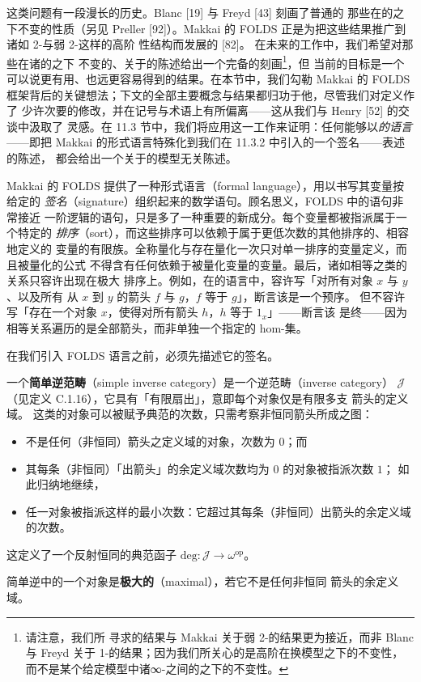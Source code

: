 这类问题有一段漫长的历史。Blanc [19] 与 Freyd [43] 刻画了普通\trCategory{}的
那些在\trCategory{}的\trEquivalence{}之下不变的性质（另见 Preller [92]）。Makkai 的
FOLDS 正是为把这些结果推广到诸如 2-\trCategory{}与弱 2-\trCategory{}这样的高阶%
\trCategory{}性结构而发展的 [82]。
在未来的工作中，我们希望对那些在诸\trInfinityCosmos{}的\trBiequivalence{}之下
不变的、关于\trInfinityCategories{}的陈述给出一个完备的刻画\footnote{请注意，我们所
寻求的结果与 Makkai 关于弱 2-\trCategory{}的结果更为接近，而非 Blanc 与 Freyd 关于
1-\trCategory{}的结果；因为我们所关心的是高阶\trCategory{}在换模型之下的不变性，
而不是某个给定模型中诸∞-\trCategory{}之间的\trEquivalence{}之下的不变性。}，但
当前的目标是一个可以说更有用、也远更容易得到的结果。在本节中，我们勾勒 Makkai 的
FOLDS 框架背后的关键想法；下文的全部主要概念与结果都归功于他，尽管我们对定义作了
少许次要的修改，并在记号与术语上有所偏离——这从我们与 Henry [52] 的交谈中汲取了
灵感。在 11.3 节中，我们将应用这一工作来证明：任何能够以\emph{\trVirtualEquipment{}的语言}
——即把 Makkai 的形式语言特殊化到我们在 11.3.2 中引入的一个签名——表述的陈述，
都会给出一个关于\trInfinityCategories{}的模型无关陈述。

Makkai 的 FOLDS 提供了一种形式语言（formal language），用以书写其变量按给定的%
\emph{签名}（signature）组织起来的数学语句。顾名思义，FOLDS 中的语句非常接近
一阶逻辑的语句，只是多了一种重要的新成分。每个变量都被指派属于一个特定的%
\emph{排序}（sort），而这些排序可以依赖于属于更低次数的其他排序的、相容地定义的
变量的有限族。全称量化与存在量化一次只对单一排序的变量定义，而且被量化的公式
不得含有任何依赖于被量化变量的变量。最后，诸如相等之类的关系只容许出现在极大
排序上。例如，在\trCategory{}的语言中，容许写「对所有对象 $x$ 与 $y$、以及所有
从 $x$ 到 $y$ 的箭头 $f$ 与 $g$，$f$ 等于 $g$」，断言该\trCategory{}是一个预序。
但不容许写「存在一个对象 $x$，使得对所有箭头 $h$，$h$ 等于 $1_{x}$」——断言该%
\trCategory{}是终\trCategory{}——因为相等关系遍历的是全部箭头，而非单独一个指定的
hom-集。

在我们引入 FOLDS 语言之前，必须先描述它的签名。

\begin{definition}\label{def:simple-inverse-category}
一个\textbf{简单逆范畴}（simple inverse category）是一个逆范畴（inverse category）
$\mathcal{J}$（见定义 C.1.16），它具有「有限扇出」，意即每个对象仅是有限多支%
箭头的定义域。
这类\trCategory{}的对象可以被赋予典范的次数，只需考察非恒同箭头所成之图：
\begin{itemize}
\item 不是任何（非恒同）箭头之定义域的对象，次数为 $0$；而
\item 其每条（非恒同）「出箭头」的余定义域次数均为 $0$ 的对象被指派次数 $1$；
  如此归纳地继续，
\item 任一对象被指派这样的最小次数：它超过其每条（非恒同）出箭头的余定义域的次数。
\end{itemize}
这定义了一个反射恒同的典范函子 $\mathrm{deg}\colon\mathcal{J}\to\omega^{\mathrm{op}}$。

简单逆\trCategory{}中的一个对象是\textbf{极大的}（maximal），若它不是任何非恒同
箭头的余定义域。
\end{definition}

